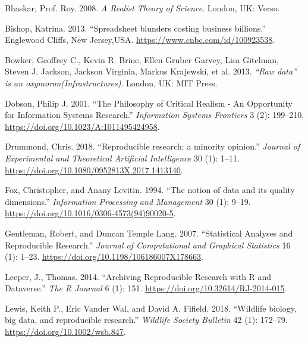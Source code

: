 \documentclass[smallextended]{svjour3}       %
\newlength{\cslhangindent}
\newlength{\cslentryspacingunit} %
\newenvironment{CSLReferences}[2] %
 {%
  \setlength{\parindent}{0pt}
  \ifodd #1
  \let\oldpar\par
  \def\par{\hangindent=\cslhangindent\oldpar}
  \fi
  \setlength{\parskip}{#2\cslentryspacingunit}
 }%
 {}
\begin{document}
\hypertarget{refs}{}
\begin{CSLReferences}{1}{0}
\leavevmode{}%
Bhaskar, Prof. Roy. 2008. \emph{{A Realist Theory of Science}}. London, UK: Verso.

\leavevmode{}%
Bishop, Katrina. 2013. {``{Spreadsheet blunders costing business billions}.''} Englewood Cliffs, New Jersey,USA. \url{https://www.cnbc.com/id/100923538}.

\leavevmode{}%
Bowker, Geoffrey C., Kevin R. Brine, Ellen Gruber Garvey, Lisa Gitelman, Steven J. Jackson, Jackson Virginia, Markus Krajewski, et al. 2013. \emph{{{``Raw data''} is an oxymoron(Infrastructures)}}. London, UK: MIT Press.

\leavevmode{}%
Dobson, Philip J. 2001. {``{The Philosophy of Critical Realism - An Opportunity for Information Systems Research}.''} \emph{Information Systems Frontiers} 3 (2): 199--210. \url{https://doi.org/10.1023/A:1011495424958}.

\leavevmode{}%
Drummond, Chris. 2018. {``{Reproducible research: a minority opinion}.''} \emph{Journal of Experimental and Theoretical Artificial Intelligence} 30 (1): 1--11. \url{https://doi.org/10.1080/0952813X.2017.1413140}.

\leavevmode{}%
Fox, Christopher, and Anany Levitin. 1994. {``{The notion of data and its quality dimensions}.''} \emph{Information Processing and Management} 30 (1): 9--19. \url{https://doi.org/10.1016/0306-4573(94)90020-5}.

\leavevmode{}%
Gentleman, Robert, and Duncan Temple Lang. 2007. {``{Statistical Analyses and Reproducible Research}.''} \emph{Journal of Computational and Graphical Statistics} 16 (1): 1--23. \url{https://doi.org/10.1198/106186007X178663}.

\leavevmode{}%
Leeper, J., Thomas. 2014. {``{Archiving Reproducible Research with R and Dataverse}.''} \emph{The R Journal} 6 (1): 151. \url{https://doi.org/10.32614/RJ-2014-015}.

\leavevmode{}%
Lewis, Keith P., Eric Vander Wal, and David A. Fifield. 2018. {``{Wildlife biology, big data, and reproducible research}.''} \emph{Wildlife Society Bulletin} 42 (1): 172--79. \url{https://doi.org/10.1002/wsb.847}.


\end{CSLReferences}
\end{document}
